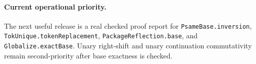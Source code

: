 \paragraph{Current operational priority.}
The next useful release is a real checked proof report for \texttt{PsameBase.inversion}, \texttt{TokUnique.tokenReplacement}, \texttt{PackageReflection.base}, and \texttt{Globalize.exactBase}. Unary right-shift and unary continuation commutativity remain second-priority after base exactness is checked.
